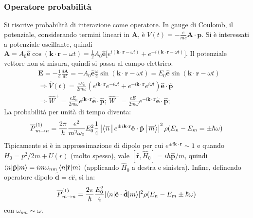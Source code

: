 \documentclass[10pt, a4paper]{scrartcl}
\numberwithin{equation}{subsection}
\theoremstyle{style1}
\theoremstyle{style2}
\begin{document}
\subsubsection{Operatore probabilit\`a}
Si riscrive probabilit\`a di interazione come operatore. In gauge di Coulomb, il potenziale, considerando termini lineari in $\mathbf{A} $, \`e $V(t) = - \frac{e}{mc}\mathbf{A} \cdot \mathbf{p} $.
Si \`e interessati a potenziale oscillante, quindi $\mathbf{A}  = A_0 \hat{\mathbf{e} } \cos(\mathbf{k} \cdot \mathbf{r} -\omega t)= \frac{1}{2}A_0 \hat{\mathbf{e} }\big[e^{i(\mathbf{k} \cdot \mathbf{r} -\omega t)}+e^{- i (\mathbf{k}\cdot \mathbf{r} -\omega t) } \big] $.
Il potenziale vettore non si misura, quindi si passa al campo elettrico:
\[
	\begin{split}
		&\mathbf{E} = - \frac{1}{c} \frac{d \mathbf{A} }{d t} = - A_0 \hat{\mathbf{e} } \frac{\omega}{c} \sin(\mathbf{k} \cdot \mathbf{r} -\omega t) = E_0 \hat{\mathbf{e} }\sin\left(\mathbf{k} \cdot \mathbf{r}- \omega t \right) \\
		&\Rightarrow \hat{V}(t) = \frac{eE_0}{2m\omega}\left(e^{i \mathbf{k} \cdot \mathbf{r} } e^{-i\omega t} + e^{-i\mathbf{k} \cdot \mathbf{r} } e^{i\omega t} \right) \hat{\mathbf{e} }\cdot \hat{\mathbf{p} }\\
		&\Rightarrow  \hat{W}^+ = \frac{eE_0}{2m\omega} e^{i\mathbf{k} \cdot \mathbf{r} } \hat{\mathbf{e} } \cdot \hat{\mathbf{p} };  \ \hat{W}^- = \frac{eE_0}{2m\omega} e^{-i\mathbf{k} \cdot \mathbf{r} } \hat{\mathbf{e} } \cdot \hat{\mathbf{p} };  \ 
	\end{split}
\] 
La probabilit\`a per unit\`a di tempo diventa:
\begin{equation}
	\overline{P}^{(1)} _{m\to n} = \frac{2\pi}{\hbar } \frac{e^2 }{m^2 \omega_0} E_0^2 \frac{1}{4} \left\lvert \Braket{\overline{n}|e^{\pm i \mathbf{k} \cdot \mathbf{r} } \hat{\mathbf{e}}\cdot \hat{\mathbf{p} }|\overline{m}}  \right\rvert ^2 \rho (E_n-E_m = \pm\hbar \omega)
\end{equation}
Tipicamente si \`e in approssimazione di dipolo per cui $e^{\pm i\mathbf{k} \cdot \mathbf{r} } \sim 1 $ e quando $H_0 = p^2 / 2m + U(r)$ (molto spesso), vale $[\hat{\mathbf{r} }, \hat{H}_0] = i\hbar  \hat{\mathbf{p} } / m$, quindi $\braket{n|\hat{\mathbf{p} }|m} = i m \omega_{nm} \braket{n|\hat{\mathbf{r} }|m} $ (applicando $\hat{H}_0$ a destra e sinistra).
Infine, definendo operatore dipolo $\hat{\mathbf{d} }= e \hat{\mathbf{r} }$, si ha:
\begin{equation}
	\overline{P}^{(1)} _{m\to n} = \frac{2\pi}{\hbar }\frac{E_0^2}{4}\lvert \braket{n|\hat{\mathbf{e} }\cdot \hat{\mathbf{d} }|m}  \rvert ^2 \rho (E_n-E_m \pm \hbar \omega)
\end{equation}
con $\omega_{nm} \sim \omega$.
\end{document}
